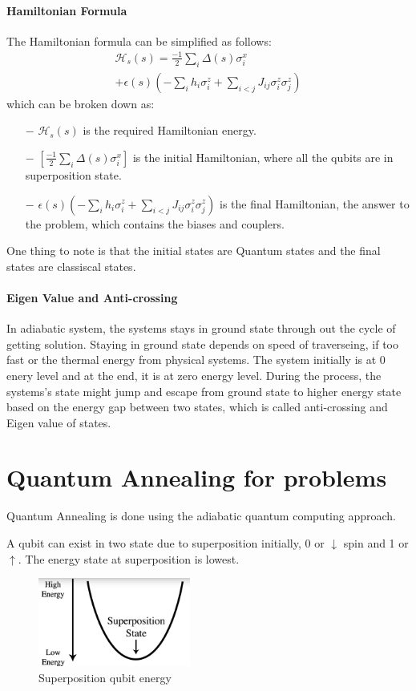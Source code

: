 \documentclass[12pt,conference]{IEEEtran}
\begin{document}
\paragraph{Hamiltonian Formula} 
The Hamiltonian formula can be simplified as follows:
\begin{multline*}
  \mathcal{H}_s(s) = \frac{-1}{2} \sum_i \Delta (s) \sigma_i^x  \\ + \epsilon(s) ( - \sum_i h_i \sigma_i^z + \sum_{i<j} J_{ij}  \sigma_i^z \sigma_j^z)
\end{multline*}
which can be broken down as:
\begin{itemize}
  \item[$-$] $\mathcal{H}_s(s)$ is the required Hamiltonian energy.
  \item[$-$] $[\frac{-1}{2} \sum_i \Delta (s) \sigma_i^x]$ is the initial Hamiltonian, where all the qubits are in superposition state.
  \item[$-$] $ \epsilon(s) ( - \sum_i h_i \sigma_i^z + \sum_{i<j} J_{ij}  \sigma_i^z \sigma_j^z)$ is the final Hamiltonian, the answer to the problem, which contains the biases and couplers.
\end{itemize} 
One thing to note is that the initial states are Quantum states and the final states are classiscal states.

\paragraph{Eigen Value and Anti-crossing}
In adiabatic system, the systems stays in ground state through out the cycle of getting solution. Staying in ground state depends on speed of traverseing, if too fast or the thermal energy from physical systems. The system initially is at 0 enery level and at the end, it is at zero energy level. During the process, the systems's state might jump and escape from ground state to higher energy state based on the energy gap between two states, which is called anti-crossing and Eigen value of states.

\section{Quantum Annealing for problems} \cite{4}
Quantum Annealing is done using the adiabatic quantum computing approach.

A qubit can exist in two state due to superposition initially, 0 or $\downarrow$  spin and 1 or $\uparrow$. The energy state at superposition is lowest. 
\begin{figure}[h]
  \centering
  \includegraphics[width=5cm]{sp-energy.png}
  \caption{Superposition qubit energy}
  \label{fig:SPQbitE}
\end{figure}
\end{document}
